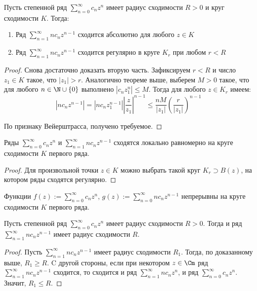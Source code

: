 \begin{proposition}
	Пусть степенной ряд $\sum_{n=0}^\infty c_nz^n$ имеет радиус сходимости $R > 0$ и круг сходимости $K$. Тогда:
	\begin{enumerate}
		\item Ряд $\sum_{n = 1}^\infty nc_nz^{n-1}$ сходится абсолютно для любого $z \in K$
		\item Ряд $\sum_{n = 1}^\infty nc_nz^{n-1}$ сходится регулярно в круге $K_r$ при любом $r < R$
	\end{enumerate}
\end{proposition}

\begin{proof}
	Снова достаточно доказать вторую часть. Зафиксируем $r < R$ и число $z_1 \in K$ такое, что $|z_1| > r$. Аналогично теореме выше, выберем $M > 0$ такое, что для любого $n \in \N \cup \{0\}$ выполнено $|c_nz_1^n| \le M$. Тогда для любого $z \in K_r$ имеем:
	\[\left|nc_nz^{n-1}\right| = \left|nc_nz_1^{n-1}\right|\left|\frac{z}{z_1}\right|^{n-1} \le \frac{nM}{|z_1|}\left(\frac{r}{|z_1|}\right)^{n-1}\]
	
	По признаку Вейерштрасса, получено требуемое.
\end{proof}

\begin{corollary}
	Ряды $\sum_{n=0}^\infty c_nz^n$ и $\sum_{n = 1}^\infty nc_nz^{n-1}$ сходятся локально равномерно на круге сходимости $K$ первого ряда.
\end{corollary}

\begin{proof}
	Для произвольной точки $z \in K$ можно выбрать такой круг $K_r \supset B(z)$, на котором ряды сходятся регулярно.
\end{proof}

\begin{corollary}
	Функции $f(z) := \sum_{n = 0}^\infty c_nz^n$, $g(z) := \sum_{n = 0}^\infty nc_nz^{n-1}$ непрерывны на круге сходимости $K$ первого ряда.
\end{corollary}

\begin{corollary}
	Пусть степенной ряд $\sum_{n=0}^\infty c_nz^n$ имеет радиус сходимости $R > 0$. Тогда и ряд $\sum_{n = 1}^\infty nc_nz^{n-1}$ имеет радиус сходимости $R$.
\end{corollary}

\begin{proof}
	Пусть $\sum_{n = 1}^\infty nc_nz^{n-1}$ имеет радиус сходимости $R_1$. Тогда, по доказанному выше, $R_1 \ge R$. C другой стороны, если при некотором $z \in \Cm$ ряд $\sum_{n = 1}^\infty nc_nz^{n-1}$ сходится, то сходится и ряд $\sum_{n = 1}^\infty nc_nz^n$, и ряд $\sum_{n = 0}^\infty c_nz^n$. Значит, $R_1 \le R$.
\end{proof}

